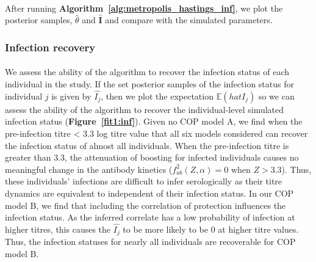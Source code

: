 \documentclass{article}
\begin{document}
\paragraph{} After running \textbf{Algorithm~\ref{alg:metropolis_hastings_inf}}, we plot the posterior samples, $\hat{\theta}$ and $\hat{\mathbf{I}}$ and compare with the simulated parameters.

\subsubsection{Infection recovery}

\paragraph{}We assess the ability of the algorithm to recover the infection status of each individual in the study. If the set posterior samples of the infection status for individual $j$ is given by $\hat{I_j} $, then we plot the expectation $\mathbb{E}(hat{I_j} )$ so we can assess the ability of the algorithm to recover the individual-level simulated infection status (\textbf{Figure~\ref{fit1:inf}}). Given no COP model A, we find when the pre-infection titre < 3.3 log titre value that all six models considered can recover the infection status of almost all individuals. When the pre-infection titre is greater than 3.3, the attenuation of boosting for infected individuals causes no meaningful change in the antibody kinetics ($f^2_{ab}(Z, \alpha) = 0$ when $Z > 3.3$). Thus, these individuals' infections are difficult to infer serologically as their titre dynamics are equivalent to independent of their infection status. In our COP model B, we find that including the correlation of protection influences the infection status. As the inferred correlate has a low probability of infection at higher titres, this causes the $\hat{I_j}$ to be more likely to be 0 at higher titre values. Thus, the infection statuses for nearly all individuals are recoverable for COP model B.
\end{document}
